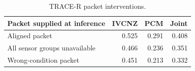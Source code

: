 \begin{table}[!t]
\centering
\caption{TRACE-R packet interventions.}
\label{tab:metadata_controls}
\footnotesize
\setlength{\tabcolsep}{3.7pt}
\begin{tabular}{lrrr}
\toprule
Packet supplied at inference & IVCNZ & PCM & Joint \\
\midrule
Aligned packet & 0.525 & 0.291 & 0.408 \\
All sensor groups unavailable & 0.466 & 0.236 & 0.351 \\
Wrong-condition packet & 0.451 & 0.213 & 0.332 \\
\bottomrule
\end{tabular}
\end{table}
